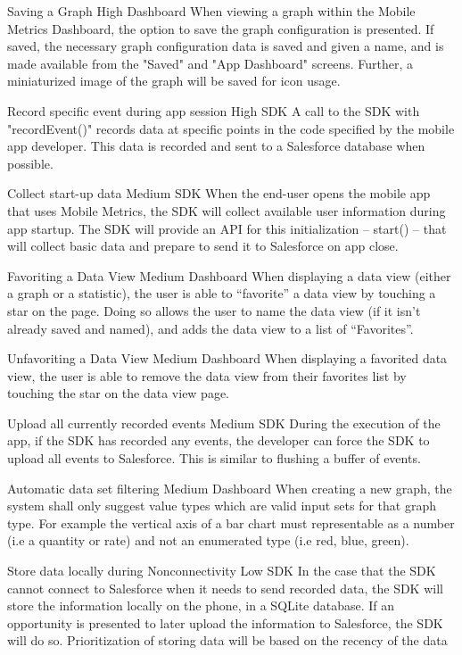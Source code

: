 \documentclass[12pt,oneside,letterpaper]{article}
\begin{document}
{Saving a Graph}
{High}
{Dashboard}
{When viewing a graph within the Mobile Metrics Dashboard, the option to save the graph configuration is presented. If saved, the necessary graph configuration data is saved and given a name, and is made available from the "Saved" and "App Dashboard" screens. Further, a miniaturized image of the graph will be saved for icon usage.}

{Record specific event during app session}
{High}
{SDK}
{A call to the SDK with "recordEvent()" records data at specific points in the code specified by the mobile app developer. This data is recorded and sent to a Salesforce database when possible.}

{Collect start-up data}
{Medium}
{SDK}
{When the end-user opens the mobile app that uses Mobile Metrics, the SDK will collect available user information during app startup. The SDK will provide an API for this initialization -- start() -- that will collect basic data and prepare to send it to Salesforce on app close.}


{Favoriting a Data View}
{Medium}
{Dashboard}
{When displaying a data view (either a graph or a statistic), the user is able to “favorite” a data view by touching a star on the page. Doing so allows the user to name the data view (if it isn’t already saved and named), and adds the data view to a list of “Favorites”.}

{Unfavoriting a Data View}
{Medium}
{Dashboard}
{When displaying a favorited data view, the user is able to remove the data view from their favorites list by touching the star on the data view page.}

{Upload all currently recorded events}
{Medium}
{SDK}
{During the execution of the app, if the SDK has recorded any events, the developer can force the SDK to upload all events to Salesforce. This is similar to flushing a buffer of events.}

{Automatic data set filtering}
{Medium}
{Dashboard}
{When creating a new graph, the system shall only suggest value types which are valid input sets for that graph type. For example the vertical axis of a bar chart must representable as a number (i.e a quantity or rate) and not an enumerated type (i.e red, blue, green). }

{Store data locally during Nonconnectivity}
{Low}
{SDK}
{In the case that the SDK cannot connect to Salesforce when it needs to send recorded data, the SDK will store the information locally on the phone, in a SQLite database. If an opportunity is presented to later upload the information to Salesforce, the SDK will do so. Prioritization of storing data will be based on the recency of the data}
\end{document}
